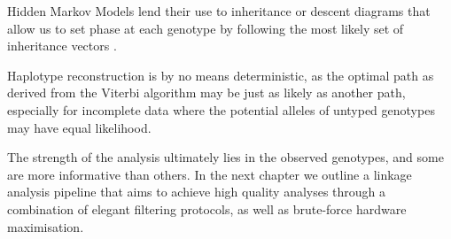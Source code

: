 Hidden Markov Models lend their use to inheritance or descent diagrams that allow us to set phase at each genotype by following the most likely set of inheritance vectors \cite{sobel1996descent}.

Haplotype reconstruction is by no means deterministic, as the optimal path as derived from the Viterbi algorithm may be just as likely as another path, especially for incomplete data where the potential alleles of untyped genotypes may have equal likelihood. 

The strength of the analysis ultimately lies in the observed genotypes, and some are more informative than others. In the next chapter we outline a linkage analysis pipeline that aims to achieve high quality analyses through a combination of elegant filtering protocols, as well as brute-force hardware maximisation. 


































